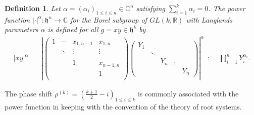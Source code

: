 \documentclass[12pt, reqno, oneside]{amsart}
\newtheorem{definition}[corollary]{Definition}
\numberwithin{equation}{section}
\begin{document}
\begin{definition}\label{def:power-function}
Let $\alpha=(\alpha_i)_{1 \leq i \leq n} \in \mathbb{C}^n$ satisfying $\sum_{i=1}^k \alpha_i=0$. The power function $|\cdot|^{\alpha}:\mathfrak{h}^n\to\mathbb{C}$ for the Borel subgroup of $GL(k,\mathbb{R})$ with Langlands parameters $\alpha$ is defined for all $g = xy \in \mathfrak{h}^k$ by 
\begin{align}
\label{eq:power-function}
|xy|^\alpha \ = \ \left|\left(\begin{smallmatrix}
    1 & \cdots & x_{1,n-1} & x_{1,n} \\
    & \ddots & \vdots & \vdots \\
    \\
    & & 1 & x_{n-1,n} \\
    & & & 1 \\
\end{smallmatrix}\right)
\left(\begin{smallmatrix}
    Y_1 & & & \\
    & \ddots & & \\
    & & Y_{n-1} & \\
    & & & Y_n
\end{smallmatrix}\right)\right|^\alpha \ := \ \prod_{i=1}^n Y_i^{\alpha_i}.
\end{align}
\end{definition}

The phase shift $\rho^{(k)} = (\frac{k+1}{2} - i)_{1 \leq i \leq k}$ is commonly associated with the power function in keeping with the convention of the theory of root systems.
\end{document}
